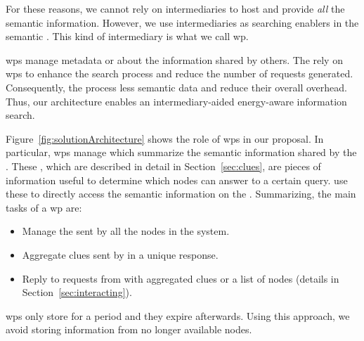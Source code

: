 For these reasons, we cannot rely on intermediaries to host and provide \emph{all} the semantic information.
However, we use intermediaries as searching enablers in the semantic \Space{}.
This kind of intermediary is what we call \acl{wp}.

\acp{wp} manage metadata or \clues{} about the information shared by others.
The \consumers{} rely on \acp{wp} to enhance the search process and reduce the number of requests generated.
Consequently, the \providers{} process less semantic data and reduce their overall overhead.
Thus, our architecture enables an intermediary-aided energy-aware information search.




Figure~\ref{fig:solutionArchitecture} shows the role of \acp{wp} in our proposal.
In particular, \acp{wp} manage \clues{} which summarize the semantic information shared by the \providers{}.
These \clues{}, which are described in detail in Section~\ref{sec:clues}, are pieces of information useful to determine which nodes can answer to a certain query.
\consumers{} use these \clues{} to directly access the semantic information on the \providers{}.
Summarizing, the main tasks of a \ac{wp} are:
\begin{itemize}
 \item Manage the \clues{} sent by all the nodes in the system.
 \item Aggregate clues sent by \providers{} in a unique response.
 \item Reply to requests from \consumers{} with aggregated clues or a list of nodes (details in Section~\ref{sec:interacting}).
\end{itemize}

\acp{wp} only store \clues{} for a period and they expire afterwards.
Using this approach, we avoid storing information from no longer available nodes.



